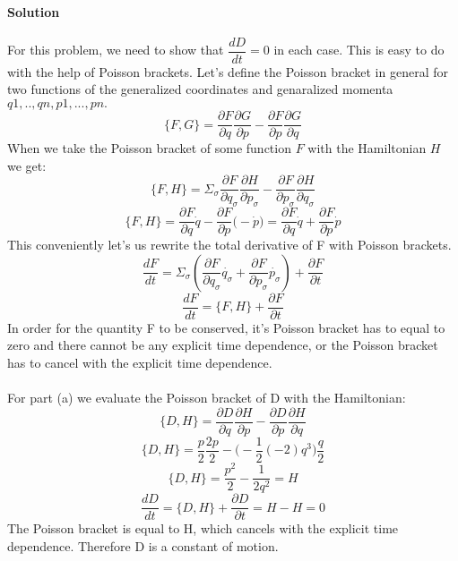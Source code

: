 \documentclass[11pt,a4paper]{report}
\begin{document}
\paragraph{Solution} For this problem, we need to show that $\dfrac{dD}{dt}=0$ in each case. This is easy to do with the help of Poisson brackets. Let's define the Poisson bracket in general for two functions of the generalized coordinates and genaralized momenta $q1,..,qn, p1, ..., pn.$
\begin{equation}
\{F, G\} = \dfrac{\partial F}{\partial q}\dfrac{\partial G}{\partial p}-\dfrac{\partial F}{\partial p}\dfrac{\partial G}{\partial q}
\end{equation}
When we take the Poisson bracket of some function $F$ with the Hamiltonian $H$ we get:
\begin{equation}
\{F, H\} = \Sigma_\sigma \dfrac{\partial F}{\partial q_\sigma}\dfrac{\partial H}{\partial p_\sigma} - \dfrac{\partial F}{\partial p_\sigma}\dfrac{\partial H}{\partial q_\sigma}
\end{equation}
\begin{equation}
\{F, H\} = \dfrac{\partial F}{\partial q}\dot{q} - \dfrac{\partial F}{\partial p}\Big(-\dot{p}\Big)=\dfrac{\partial F}{\partial q}\dot{q} + \dfrac{\partial F}{\partial p}\dot{p}
\end{equation}
This conveniently let's us rewrite the total derivative of F with Poisson brackets.
\begin{equation}
\dfrac{dF}{dt} = \Sigma_\sigma (\dfrac{\partial F}{\partial q_\sigma}\dot{q_\sigma} + \dfrac{\partial F}{\partial p_\sigma}\dot{p_\sigma}) +\dfrac{\partial F}{\partial t}
\end{equation}
\begin{equation}
\dfrac{dF}{dt} = \{F, H\} +\dfrac{\partial F}{\partial t}
\end{equation}
In order for the quantity F to be conserved, it's Poisson bracket has to equal to zero and there cannot be any explicit time dependence, or the Poisson bracket has to cancel with the explicit time dependence. \\ \\
For part (a) we evaluate the Poisson bracket of D with the Hamiltonian:
\begin{equation}
\{D, H\}=\dfrac{\partial D}{\partial q}\dfrac{\partial H}{\partial p}-\dfrac{\partial D}{\partial p}\dfrac{\partial H}{\partial q}
\end{equation}
\begin{equation}
\{D, H\}= \dfrac{p}{2}\dfrac{2p}{2}-\Big(-\dfrac{1}{2}(-2)q^3\Big)\dfrac{q}{2}
\end{equation}
\begin{equation}
\{D, H\} = \dfrac{p^2}{2}- \dfrac{1}{2q^2} = H
\end{equation}
\begin{equation}
\boxed{\dfrac{dD}{dt}=\{D, H\}+\dfrac{\partial D}{\partial t} = H-H=0}
\end{equation}
The Poisson bracket is equal to H, which cancels with the explicit time dependence. Therefore D is a constant of motion.
\\\\
\end{document}
